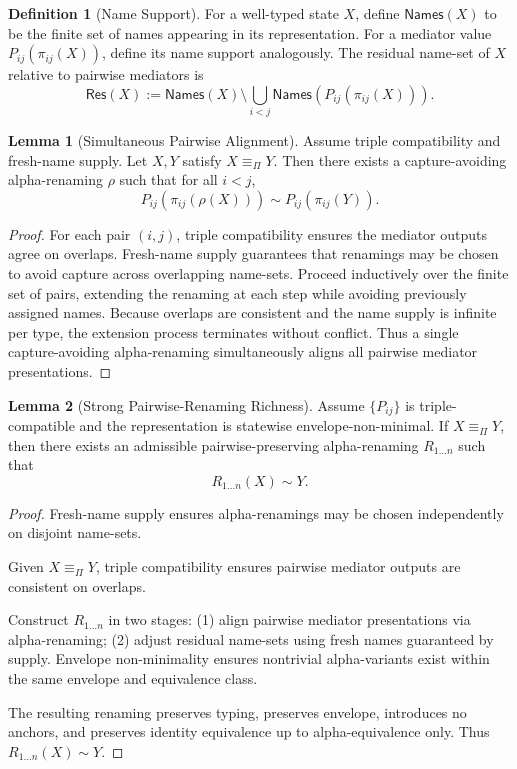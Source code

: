 \documentclass[11pt]{article}
\theoremstyle{definition}
\newtheorem{definition}{Definition}
\newtheorem{lemma}{Lemma}
\begin{document}
\begin{definition}[Name Support]
For a well-typed state $X$, define $\mathsf{Names}(X)$ to be the finite set of names appearing in its representation.
For a mediator value $P_{ij}(\pi_{ij}(X))$, define its name support analogously.
The residual name-set of $X$ relative to pairwise mediators is
\[
\mathsf{Res}(X) := \mathsf{Names}(X) \setminus \bigcup_{i<j} \mathsf{Names}(P_{ij}(\pi_{ij}(X))).
\]
\end{definition}



\begin{lemma}[Simultaneous Pairwise Alignment]
Assume triple compatibility and fresh-name supply.
Let $X,Y$ satisfy $X \equiv_{\Pi} Y$.
Then there exists a capture-avoiding alpha-renaming $\rho$ such that for all $i<j$,
\[
P_{ij}(\pi_{ij}(\rho(X))) \sim P_{ij}(\pi_{ij}(Y)).
\]
\end{lemma}

\begin{proof}
For each pair $(i,j)$, triple compatibility ensures the mediator outputs agree on overlaps.
Fresh-name supply guarantees that renamings may be chosen to avoid capture across overlapping name-sets.
Proceed inductively over the finite set of pairs, extending the renaming at each step while avoiding previously assigned names.
Because overlaps are consistent and the name supply is infinite per type, the extension process terminates without conflict.
Thus a single capture-avoiding alpha-renaming simultaneously aligns all pairwise mediator presentations.
\end{proof}

\begin{lemma}[Strong Pairwise-Renaming Richness]
Assume $\{P_{ij}\}$ is triple-compatible and the representation is statewise envelope-non-minimal.
If $X \equiv_{\Pi} Y$, then there exists an admissible pairwise-preserving alpha-renaming
$R_{1\ldots n}$ such that
\[
R_{1\ldots n}(X) \sim Y.
\]
\end{lemma}

\begin{proof}
Fresh-name supply ensures alpha-renamings may be chosen independently on disjoint name-sets.

Given $X \equiv_{\Pi} Y$, triple compatibility ensures pairwise mediator outputs are consistent on overlaps.

Construct $R_{1\ldots n}$ in two stages:
(1) align pairwise mediator presentations via alpha-renaming;
(2) adjust residual name-sets using fresh names guaranteed by supply.
Envelope non-minimality ensures nontrivial alpha-variants exist within the same envelope and equivalence class.

The resulting renaming preserves typing, preserves envelope, introduces no anchors,
and preserves identity equivalence up to alpha-equivalence only.
Thus $R_{1\ldots n}(X) \sim Y$.
\end{proof}
\end{document}
